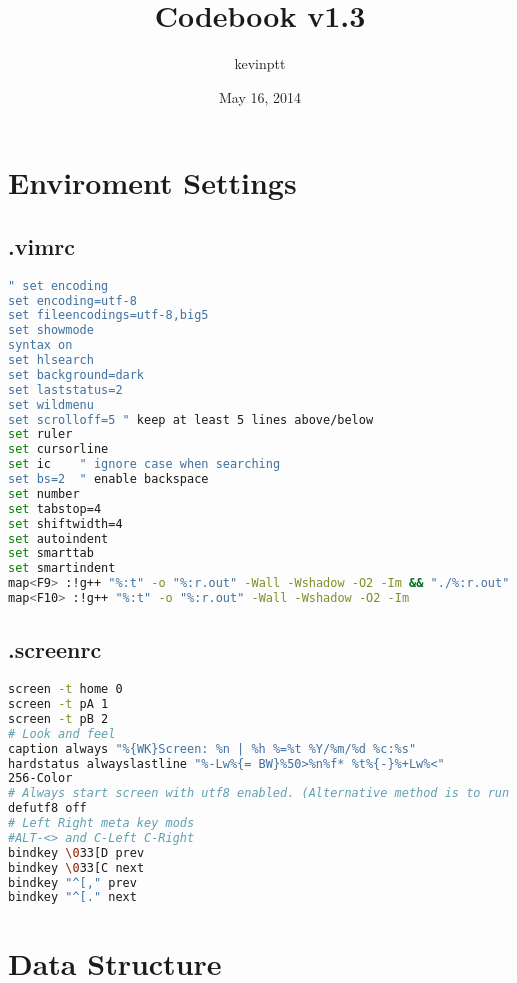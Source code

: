 \documentclass[11pt,twocolumn,a4paper]{article}
\title{Codebook v1.3}
\author{kevinptt}
\date{May 16, 2014}
\begin{document}
\renewcommand{\contentsname}{Index}
\tableofcontents

\newpage
\section{Enviroment Settings}
\subsection{.vimrc}
\begin{lstlisting}[label=.vimrc,language=bash]
" set encoding
set encoding=utf-8
set fileencodings=utf-8,big5
set showmode
syntax on
set hlsearch
set background=dark
set laststatus=2
set wildmenu
set scrolloff=5 " keep at least 5 lines above/below
set ruler
set cursorline
set ic    " ignore case when searching
set bs=2  " enable backspace
set number
set tabstop=4
set shiftwidth=4
set autoindent
set smarttab
set smartindent
map<F9> :!g++ "%:t" -o "%:r.out" -Wall -Wshadow -O2 -Im && "./%:r.out"
map<F10> :!g++ "%:t" -o "%:r.out" -Wall -Wshadow -O2 -Im
\end{lstlisting}

\subsection{.screenrc}
\begin{lstlisting}[label=.screenrc,language=bash]
screen -t home 0
screen -t pA 1
screen -t pB 2
# Look and feel
caption always "%{WK}Screen: %n | %h %=%t %Y/%m/%d %c:%s"
hardstatus alwayslastline "%-Lw%{= BW}%50>%n%f* %t%{-}%+Lw%<"
256-Color
# Always start screen with utf8 enabled. (Alternative method is to run screen with -U parameter)
defutf8 off
# Left Right meta key mods
#ALT-<> and C-Left C-Right
bindkey \033[D prev
bindkey \033[C next
bindkey "^[," prev
bindkey "^[." next
\end{lstlisting}

\newpage
\section{Data Structure}
\end{document}
